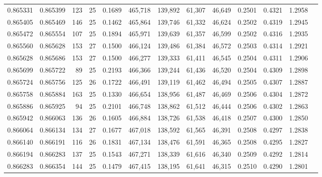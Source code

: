 \begin{tabular}{rrrrrrrrrrrrr}
0.865331 & 0.865399 &   123 &  25 &                                     0.1689 & 465,718 & 139,892 &  61,307 &  46,649 & 0.2501 & 0.4321 & 1.2958 \\
0.865405 & 0.865469 &   146 &  25 &                                     0.1462 & 465,864 & 139,746 &  61,332 &  46,624 & 0.2502 & 0.4319 & 1.2945 \\
0.865472 & 0.865554 &   107 &  25 &                                     0.1894 & 465,971 & 139,639 &  61,357 &  46,599 & 0.2502 & 0.4316 & 1.2935 \\
0.865560 & 0.865628 &   153 &  27 &                                     0.1500 & 466,124 & 139,486 &  61,384 &  46,572 & 0.2503 & 0.4314 & 1.2921 \\
0.865628 & 0.865686 &   153 &  27 &                                     0.1500 & 466,277 & 139,333 &  61,411 &  46,545 & 0.2504 & 0.4311 & 1.2906 \\
0.865699 & 0.865722 &    89 &  25 &                                     0.2193 & 466,366 & 139,244 &  61,436 &  46,520 & 0.2504 & 0.4309 & 1.2898 \\
0.865724 & 0.865756 &   125 &  26 &                                     0.1722 & 466,491 & 139,119 &  61,462 &  46,494 & 0.2505 & 0.4307 & 1.2887 \\
0.865758 & 0.865884 &   163 &  25 &                                     0.1330 & 466,654 & 138,956 &  61,487 &  46,469 & 0.2506 & 0.4304 & 1.2872 \\
0.865886 & 0.865925 &    94 &  25 &                                     0.2101 & 466,748 & 138,862 &  61,512 &  46,444 & 0.2506 & 0.4302 & 1.2863 \\
0.865942 & 0.866063 &   136 &  26 &                                     0.1605 & 466,884 & 138,726 &  61,538 &  46,418 & 0.2507 & 0.4300 & 1.2850 \\
0.866064 & 0.866134 &   134 &  27 &                                     0.1677 & 467,018 & 138,592 &  61,565 &  46,391 & 0.2508 & 0.4297 & 1.2838 \\
0.866140 & 0.866191 &   116 &  26 &                                     0.1831 & 467,134 & 138,476 &  61,591 &  46,365 & 0.2508 & 0.4295 & 1.2827 \\
0.866194 & 0.866283 &   137 &  25 &                                     0.1543 & 467,271 & 138,339 &  61,616 &  46,340 & 0.2509 & 0.4292 & 1.2814 \\
0.866283 & 0.866354 &   144 &  25 &                                     0.1479 & 467,415 & 138,195 &  61,641 &  46,315 & 0.2510 & 0.4290 & 1.2801 \\

\end{tabular}
